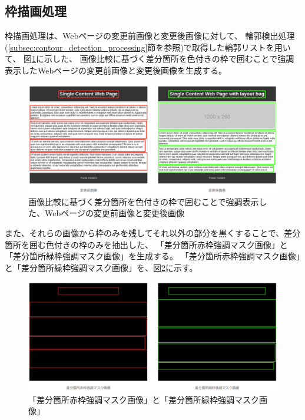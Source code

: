 \subsection{枠描画処理}\label{subsec:Bounding box drawing process}
枠描画処理は、Webページの変更前画像と変更後画像に対して、
輪郭検出処理(\ref{subsec:contour_detection_processing}節を参照)で取得した輪郭リストを用いて、
図\ref{fig: img_diff_highlight}に示した、
画像比較に基づく差分箇所を色付きの枠で囲むことで強調表示したWebページの変更前画像と変更後画像を生成する。
\begin{figure}[tp]
    \begin{center}
        \includegraphics[width=1.0\columnwidth]{image/4_img_diff_highlight.png}
        \caption{画像比較に基づく差分箇所を色付きの枠で囲むことで強調表示した、Webページの変更前画像と変更後画像}
        \label{fig: img_diff_highlight}
    \end{center}
\end{figure}
また、それらの画像から枠のみを残してそれ以外の部分を黒くすることで、差分箇所を囲む色付きの枠のみを抽出した、
「差分箇所赤枠強調マスク画像」と「差分箇所緑枠強調マスク画像」を生成する。
「差分箇所赤枠強調マスク画像」と「差分箇所緑枠強調マスク画像」を、図\ref{fig: img_diff_highlight_mask}に示す。
\begin{figure}[tp]
    \begin{center}
        \includegraphics[width=1.0\columnwidth]{image/4_img_diff_highlight_mask.png}
        \caption{「差分箇所赤枠強調マスク画像」と「差分箇所緑枠強調マスク画像」}
        \label{fig: img_diff_highlight_mask}
    \end{center}
\end{figure}
